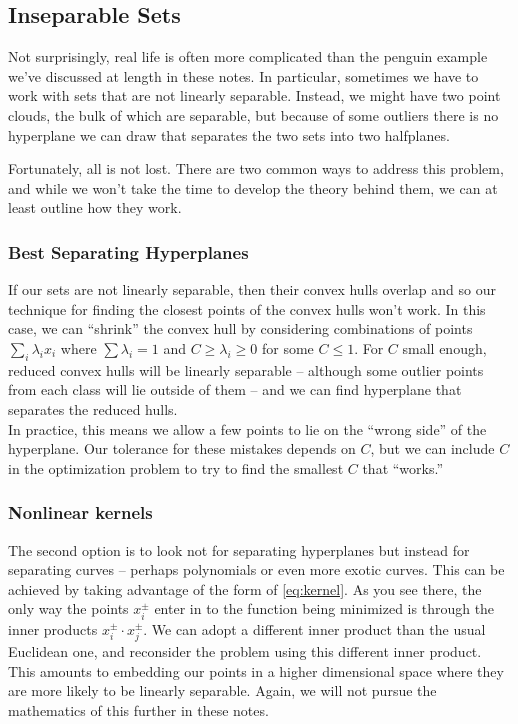 \documentclass[
]{article}
\begin{document}
\hypertarget{inseparable-sets}{%
\subsection{Inseparable Sets}\label{inseparable-sets}}

Not surprisingly, real life is often more complicated than the penguin
example we've discussed at length in these notes. In particular,
sometimes we have to work with sets that are not linearly separable.
Instead, we might have two point clouds, the bulk of which are
separable, but because of some outliers there is no hyperplane we can
draw that separates the two sets into two halfplanes.

Fortunately, all is not lost. There are two common ways to address this
problem, and while we won't take the time to develop the theory behind
them, we can at least outline how they work.

\hypertarget{best-separating-hyperplanes}{%
\subsubsection{Best Separating
Hyperplanes}\label{best-separating-hyperplanes}}

If our sets are not linearly separable, then their convex hulls overlap
and so our technique for finding the closest points of the convex hulls
won't work. In this case, we can ``shrink'' the convex hull by
considering combinations of points \(\sum_{i}\lambda_{i}x_{i}\) where
\(\sum\lambda_{i}=1\) and \(C\ge\lambda_{i}\ge 0\) for some \(C\le 1\).
For \(C\) small enough, reduced convex hulls will be linearly separable
-- although some outlier points from each class will lie outside of them
-- and we can find hyperplane that separates the reduced hulls.\\
In practice, this means we allow a few points to lie on the ``wrong
side'' of the hyperplane. Our tolerance for these mistakes depends on
\(C\), but we can include \(C\) in the optimization problem to try to
find the smallest \(C\) that ``works.''

\hypertarget{nonlinear-kernels}{%
\subsubsection{Nonlinear kernels}\label{nonlinear-kernels}}

The second option is to look not for separating hyperplanes but instead
for separating curves -- perhaps polynomials or even more exotic curves.
This can be achieved by taking advantage of the form of
\cref{eq:kernel}. As you see there, the only way the points
\(x_{i}^{\pm}\) enter in to the function being minimized is through the
inner products \(x_{i}^{\pm}\cdot x_{j}^{\pm}\). We can adopt a
different inner product than the usual Euclidean one, and reconsider the
problem using this different inner product. This amounts to embedding
our points in a higher dimensional space where they are more likely to
be linearly separable. Again, we will not pursue the mathematics of this
further in these notes.
\end{document}
